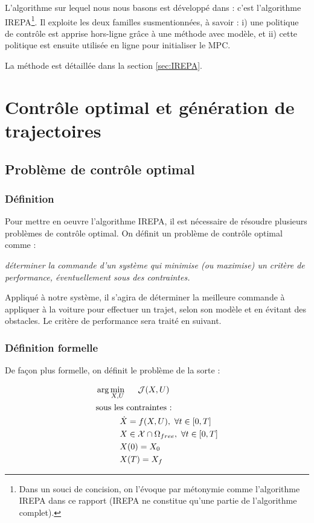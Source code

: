 \documentclass[a4paper,12pt]{report}
\begin{document}
L'algorithme sur lequel nous nous basons est développé dans \cite{mansard} : c'est l'algorithme IREPA\footnote{Dans un souci de concision, on l'évoque par métonymie comme l'algorithme IREPA dans ce rapport (IREPA ne constitue qu'une partie de l'algorithme complet).}. Il exploite les deux familles susmentionnées, à savoir : i) une politique de contrôle est apprise hors-ligne grâce à une méthode avec modèle, et ii) cette politique est ensuite utilisée en ligne pour initialiser le MPC. 

La méthode est détaillée dans la section \ref{sec:IREPA}.




\section{Contrôle optimal et génération de trajectoires}

\subsection{Problème de contrôle optimal}
\subsubsection{Définition}
Pour mettre en oeuvre l'algorithme IREPA, il est nécessaire de résoudre plusieurs problèmes de contrôle optimal. On définit un problème de contrôle optimal comme : 

\begin{center}
\textit{déterminer la commande d'un système qui minimise (ou maximise) un critère de performance, éventuellement sous des contraintes.}
\end{center}

Appliqué à notre système, il s'agira de déterminer la meilleure commande à appliquer à la voiture pour effectuer un trajet, selon son modèle et en évitant des obstacles. Le critère de performance sera traité en suivant.

\subsubsection{Définition formelle}
De façon plus formelle, on définit le problème de la sorte : 

\begin{align*}
    & \arg \min_{X, U}  \hspace{0.5cm} \mathcal{J}(X, U) \\
    & \text{sous les contraintes :} \\
    &  \hspace{1cm} \dot X = f(X,U), \ \forall t \in [0, T] \\
    & 	\hspace{1cm} X \in \mathcal{X} \cap \Omega_{free}, \ \forall t \in [0, T]  \\
    &  \hspace{1cm} X(0) = X_0 \\
    &  \hspace{1cm} X(T) = X_f \\
\end{align*}
\end{document}
